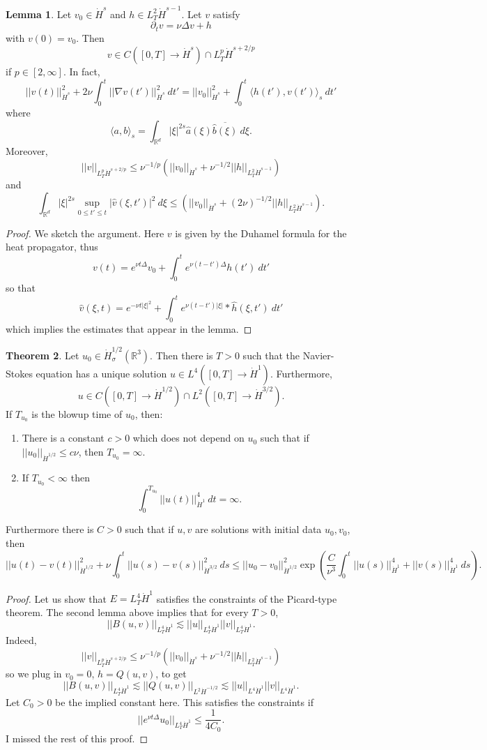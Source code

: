 \documentclass[12pt]{book}
\newcommand{\RR}{\mathbb{R}}
\theoremstyle{definition}
\newtheorem{theorem}{Theorem}[chapter]
\newtheorem{lemma}[theorem]{Lemma}
\begin{document}
\begin{lemma}
Let $v_0 \in \dot H^s$ and $h \in L^2_T \dot H^{s-1}$. Let $v$ satisfy
$$\partial_t v = \nu \Delta v + h$$
with $v(0) = v_0$. Then
$$v \in C([0, T] \to \dot H^s) \cap L^p_T \dot H^{s + 2/p}$$
if $p \in [2, \infty]$. In fact,
$$||v(t)||_{\dot H^s}^2 + 2\nu \int_0^t ||\nabla v(t')||_{\dot H^s}^2 ~dt' = ||v_0||_{\dot H^s}^2 + \int_0^t \langle h(t'), v(t')\rangle_s ~dt'$$
where
$$\langle a, b\rangle_s = \int_{\RR^d} |\xi|^{2s} \hat a(\xi) \overline{\hat b(\xi)} ~d\xi.$$
Moreover,
$$||v||_{L^p_T \dot H^{s+2/p}} \leq \nu^{-1/p} \left(||v_0||_{\dot H^s} + \nu^{-1/2} ||h||_{L^2_T \dot H^{s-1}}\right)$$
and
$$\int_{\RR^d} |\xi|^{2s} \sup_{0 \leq t' \leq t} |\hat v(\xi, t')|^2 ~d\xi \leq \left(||v_0||_{\dot H^s} + (2\nu)^{-1/2} ||h||_{L^2_T \dot H^{s-1}} \right).$$
\end{lemma}
\begin{proof}
We sketch the argument.
Here $v$ is given by the Duhamel formula for the heat propagator, thus
$$v(t) = e^{\nu t\Delta} v_0 + \int_0^t e^{\nu(t - t')\Delta} h(t') ~dt'$$
so that
$$\hat v(\xi, t) = e^{-\nu t|\xi|^2} + \int_0^t e^{\nu(t - t')|\xi|} * \hat h(\xi, t') ~dt'$$
which implies the estimates that appear in the lemma.
\end{proof}

\begin{theorem}
Let $u_0 \in \dot H^{1/2}_\sigma(\RR^3)$. Then there is $T > 0$ such that the Navier-Stokes equation has a unique solution $u \in L^4([0, T] \to \dot H^1)$. Furthermore,
$$u \in C([0, T] \to \dot H^{1/2}) \cap L^2([0, T] \to \dot H^{3/2}).$$
If $T_{u_0}$ is the blowup time of $u_0$, then:
\begin{enumerate}
\item There is a constant $c > 0$ which does not depend on $u_0$ such that if $||u_0||_{\dot H^{1/2}} \leq c\nu$, then $T_{u_0} = \infty$.
\item If $T_{u_0} < \infty$ then
$$\int_0^{T_{u_0}} ||u(t)||_{\dot H^1}^4 ~dt = \infty.$$
\end{enumerate}
Furthermore there is $C > 0$ such that if $u,v$ are solutions with initial data $u_0, v_0$, then
$$||u(t) - v(t)||_{\dot H^{1/2}}^2 + \nu \int_0^t ||u(s) - v(s)||_{\dot H^{3/2}}^2 ~ds \leq ||u_0 - v_0||_{\dot H^{1/2}}^2 \exp \left(\frac{C}{\nu^3} \int_0^t ||u(s)||_{\dot H^1}^4 + ||v(s)||_{\dot H^1}^4 ~ds\right).$$
\end{theorem}
\begin{proof}
Let us show that $E = L^4_T\dot H^1$ satisfies the constraints of the Picard-type theorem.
The second lemma above implies that for every $T > 0$,
$$||B(u, v)||_{L^4_T \dot H^1} \lesssim ||u||_{L^4_T \dot H^1} ||v||_{L^4_T \dot H^1}.$$
Indeed,
$$||v||_{L^p_T \dot H^{s+2/p}} \leq \nu^{-1/p} \left(||v_0||_{\dot H^s} + \nu^{-1/2} ||h||_{L^2_T \dot H^{s-1}}\right)$$
so we plug in $v_0 = 0$, $h = Q(u, v)$, to get
$$||B(u, v)||_{L^4_T \dot H^1} \lesssim ||Q(u, v)||_{L^2 \dot H^{-1/2}} \lesssim ||u||_{L^4 \dot H^1} ||v||_{L^4 \dot H^1}.$$
Let $C_0 > 0$ be the implied constant here.
This satisfies the constraints if
$$||e^{\nu t \Delta} u_0||_{L^4_T \dot H^1} \leq \frac{1}{4C_0}.$$
I missed the rest of this proof.
\end{proof}
\end{document}
